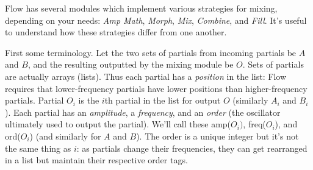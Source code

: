 \documentclass{article}
\newcommand\name{Flow}
\begin{document}
{\name} has several modules which implement various strategies for mixing, depending on your needs: {\it Amp Math}, {\it Morph}, {\it Mix}, {\it Combine}, and {\it Fill}.  It's useful to understand how these strategies differ from one another.

First some terminology.  Let the two sets of partials from incoming partials be \(A\) and \(B\), and the resulting outputted by the mixing module be \(O\).   Sets of partials are actually arrays (lists).  Thus each partial has a {\it position} in the list: {\name} requires that lower-frequency partials have lower positions than higher-frequency partials.  Partial \(O_i\) is the \(i\)th partial in the list for output \(O\) (similarly \(A_i\) and \(B_i\)).  Each partial has an {\it amplitude}, a {\it frequency}, and an {\it order} (the oscillator ultimately used to output the partial).  We'll call these amp(\(O_i)\), freq(\(O_i\)), and ord(\(O_i\)) (and similarly for \(A\) and \(B\)).  The order is a unique integer but it's not the same thing as \(i\): as partials change their frequencies, they can get rearranged in a list but maintain their respective order tags.
\end{document}
